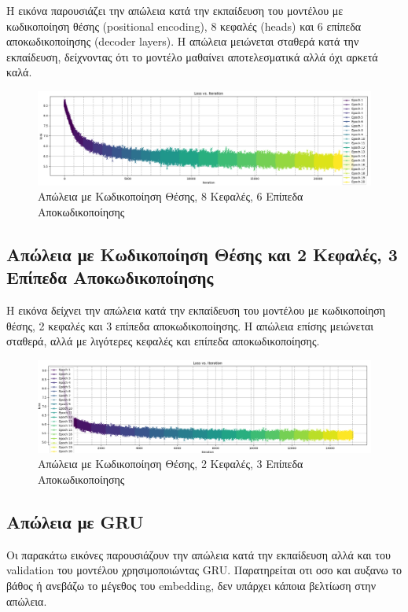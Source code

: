 \documentclass[conference]{IEEEtran}
\begin{document}
Η εικόνα παρουσιάζει την απώλεια κατά την εκπαίδευση του μοντέλου με κωδικοποίηση θέσης (\textlatin{positional encoding}), 8 κεφαλές (\textlatin{heads}) και 6 επίπεδα αποκωδικοποίησης (\textlatin{decoder layers}). Η απώλεια μειώνεται σταθερά κατά την εκπαίδευση, δείχνοντας ότι το μοντέλο μαθαίνει αποτελεσματικά αλλά όχι αρκετά καλά.


\begin{figure}[htbp]
    \centerline{\includegraphics[width=0.95\linewidth]{1.png}}
    \caption{Απώλεια με Κωδικοποίηση Θέσης, 8 Κεφαλές, 6 Επίπεδα Αποκωδικοποίησης}
\end{figure}


\subsection{Απώλεια με Κωδικοποίηση Θέσης και 2 Κεφαλές, 3 Επίπεδα Αποκωδικοποίησης}

Η εικόνα δείχνει την απώλεια κατά την εκπαίδευση του μοντέλου με κωδικοποίηση θέσης, 2 κεφαλές και 3 επίπεδα αποκωδικοποίησης. Η απώλεια επίσης μειώνεται σταθερά, αλλά με λιγότερες κεφαλές και επίπεδα αποκωδικοποίησης.


\begin{figure}[htbp]
    \centerline{\includegraphics[width=0.95\linewidth]{2.png}}
    \caption{Απώλεια με Κωδικοποίηση Θέσης, 2 Κεφαλές, 3 Επίπεδα Αποκωδικοποίησης}
\end{figure}


\subsection{Απώλεια με \textlatin{GRU}}

Οι παρακάτω εικόνες παρουσιάζουν την απώλεια κατά την εκπαίδευση αλλά και του \textlatin{validation} του μοντέλου χρησιμοποιώντας \textlatin{GRU}. Παρατηρείται οτι οσο και αυξανω το βάθος ή ανεβάζω το μέγεθος του embedding, δεν υπάρχει κάποια βελτίωση στην απώλεια. 
\end{document}
